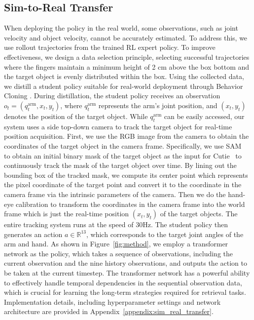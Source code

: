 \documentclass[10pt, a4paper, logo, twocolumn, copyright]{psibot} %
\begin{document}
\subsection{Sim-to-Real Transfer}\label{sec:sim2real}
When deploying the policy in the real world, some observations, such as joint velocity and object velocity, cannot be accurately estimated. To address this, we use rollout trajectories from the trained RL expert policy. To improve effectiveness, we design a data selection principle, selecting successful trajectories where the fingers maintain a minimum height of 2 cm above the box bottom and the target object is evenly distributed within the box. Using the collected data, we distill a student policy suitable for real-world deployment through Behavior Cloning \cite{NIPS1988_812b4ba2}. During distillation, the student policy receives an observation $o_t = (q^\textrm{arm}_t, x_t, y_t)$, where $q^\textrm{arm}_t$ represents the arm’s joint position, and $(x_t, y_t)$ denotes the position of the target object. While $q^\textrm{arm}_t$ can be easily accessed, our system uses a side top-down camera to track the target object for real-time position acquisition. First, we use the RGB image from the camera to obtain the coordinates of the target object in the camera frame. Specifically, we use SAM~\cite{kirillov2023segment} to obtain an initial binary mask of the target object as the input for Cutie~\cite{cheng2024putting} to continuously track the mask of the target object over time. By lining out the bounding box of the tracked mask, we compute its center point which represents the pixel coordinate of the target point and convert it to the coordinate in the camera frame via the intrinsic parameters of the camera. Then we do the hand-eye calibration to transform the coordinates in the camera frame into the world frame which is just the real-time position $(x_t, y_t)$ of the target objects. The entire tracking system runs at the speed of 30Hz. The student policy then generates an action $a \in \mathbb{R}^{13}$, which corresponds to the target joint angles of the arm and hand. As shown in Figure~\ref{fig:method}, we employ a transformer network as the policy, which takes a sequence of observations, including the current observation and the nine history observations, and outputs the action to be taken at the current timestep. The transformer network has a powerful ability to effectively handle temporal dependencies in the sequential observation data, which is crucial for learning the long-term strategies required for retrieval tasks. Implementation details, including hyperparameter settings and network architecture are provided in Appendix~\ref{appendix:sim_real_transfer}.
\end{document}
